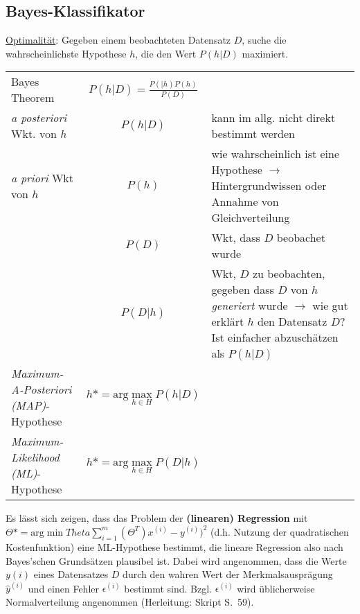 \subsection{Bayes-Klassifikator}
\label{bayes}

\underline{Optimalität}: Gegeben einem beobachteten Datensatz $D$, suche die wahrscheinlichste Hypothese $h$, die den Wert $P(h\vert D)$ maximiert.

\begin{center}
    \begin{tabular}{|l|c|l|}
        \hline
        Bayes Theorem                               & $P(h\vert D)=\frac{P(\vert h)P(h)}{P(D)}$ &\\
        \emph{a posteriori} Wkt. von $h$            & $P(h\vert D)$ & kann im allg. nicht direkt bestimmt werden\\
        \emph{a priori} Wkt von $h$                 & $P(h)$ & wie wahrscheinlich ist eine Hypothese $\rightarrow$ Hintergrundwissen oder Annahme von Gleichverteilung\\
                                                    & $P(D)$ & Wkt, dass $D$ beobachet wurde\\
                                                    & $P(D\vert h)$ & Wkt, $D$ zu beobachten, gegeben dass $D$ von $h$ \emph{generiert} wurde $\rightarrow$ wie gut erklärt $h$ den Datensatz $D$? Ist einfacher abzuschätzen als $P(h\vert D)$\\
        \emph{Maximum-A-Posteriori (MAP)}-Hypothese & $h* = \text{arg} \underset{h\in H}{\max}P(h\vert D)$ & \\
        \emph{Maximum-Likelihood (ML)}-Hypothese    & $h* = \text{arg} \underset{h\in H}{\max}P(D\vert h)$ & \\
        \hline
    \end{tabular}
\end{center}

Es lässt sich zeigen, dass das Problem der \textbf{(linearen) Regression} mit $\Theta* = \text{arg} \min{Theta}\sum_{i=1}^m (\Theta^T)x^{(i)}-y^{(i)})^2$ (d.h. Nutzung der quadratischen Kostenfunktion) eine ML-Hypothese bestimmt, die lineare Regression also nach Bayes'schen Grundsätzen plausibel ist. Dabei wird angenommen, dass die Werte $y{(i)}$ eines Datensatzes $D$ durch den wahren Wert der Merkmalsausprägung $\hat{y}^{(i)}$ und einen Fehler $\epsilon^{(i)}$ bestimmt sind. Bzgl. $\epsilon^{(i)}$ wird üblicherweise Normalverteilung angenommen (Herleitung: Skript S.~59).\\


